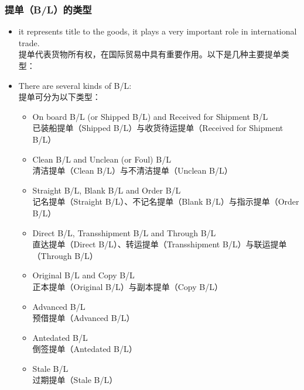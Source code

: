 \documentclass[12pt]{beamer}
\begin{document}
\begin{frame}[allowframebreaks]
    \frametitle{提单（B/L）的类型}
    \begin{itemize}
    \item it represents title to the goods, it plays a very important role in international trade. \\
    提单代表货物所有权，在国际贸易中具有重要作用。以下是几种主要提单类型：
    
    \item There are several kinds of B/L: \\
    提单可分为以下类型：
    
    \begin{itemize}
    \item On board B/L (or Shipped B/L) and Received for Shipment B/L \\
    已装船提单（Shipped B/L）与收货待运提单（Received for Shipment B/L）
    
    \item Clean B/L and Unclean (or Foul) B/L \\
    清洁提单（Clean B/L）与不清洁提单（Unclean B/L）
    
    \item Straight B/L, Blank B/L and Order B/L \\
    记名提单（Straight B/L）、不记名提单（Blank B/L）与指示提单（Order B/L）
    
    \item Direct B/L, Transshipment B/L and Through B/L \\
    直达提单（Direct B/L）、转运提单（Transshipment B/L）与联运提单（Through B/L）
    
    \item Original B/L and Copy B/L \\
    正本提单（Original B/L）与副本提单（Copy B/L）
    
    \item Advanced B/L \\
    预借提单（Advanced B/L）
    
    \item Antedated B/L \\
    倒签提单（Antedated B/L）
    
    \item Stale B/L \\
    过期提单（Stale B/L）
    \end{itemize}
    \end{itemize}
    \end{frame}
    
\end{document}
